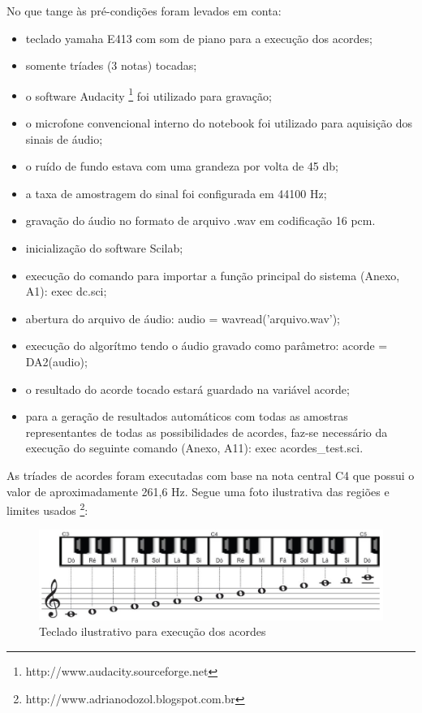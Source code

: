 No que tange às pré-condições foram levados em conta:
\begin{itemize}
    \item teclado yamaha E413 com som de piano para a execução dos acordes;
    \item somente tríades (3 notas) tocadas;
    \item o software Audacity \footnote{http://www.audacity.sourceforge.net} foi utilizado para gravação;
    \item o microfone convencional interno do notebook foi utilizado para aquisição dos sinais de áudio;
    \item o ruído de fundo estava com uma grandeza por volta de 45 db;
    \item a taxa de amostragem do sinal foi configurada em 44100 Hz;
    \item gravação do áudio no formato de arquivo .wav em codificação 16 pcm.
    \item inicialização do software Scilab;
    \item execução do comando para importar a função principal do sistema (Anexo, A1): exec dc.sci;
    \item abertura do arquivo de áudio: audio = wavread('arquivo.wav');
    \item execução do algorítmo tendo o áudio gravado como parâmetro: acorde = DA2(audio);
    \item o resultado do acorde tocado estará guardado na variável acorde;
    \item para a geração de resultados automáticos com todas as amostras representantes de todas as possibilidades de acordes, faz-se necessário da execução do seguinte comando (Anexo, A11): exec acordes{\_}test.sci.
\end{itemize}

\newpage
As tríades de acordes foram executadas com base na nota central C4 que possui o valor de aproximadamente 261,6 Hz. Segue uma foto ilustrativa das regiões e limites usados \footnote{http://www.adrianodozol.blogspot.com.br}:

\begin{figure}[h]
	\centering
		\includegraphics[keepaspectratio=true,scale=0.4]{figuras/teclado-tcc1.eps}
	\caption{Teclado ilustrativo para execução dos acordes}
\end{figure}

